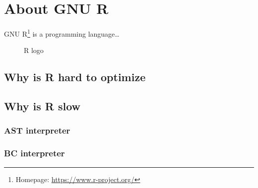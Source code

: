 \chapter{About GNU R}

GNU R\footnote{Homepage: \url{https://www.r-project.org/}} is a programming language\dots



\blind[1]

\begin{figure}[htbp]
\centering
{}
\caption{\label{fig:rlogo} R logo}
\end{figure}

\section{Why is R hard to optimize}
\todo
\blind[4]

\section{Why is R slow}
\todo
\blind[1]

\subsection{AST interpreter}
\todo
\blind[1]

\subsection{BC interpreter}
\todo
\blind[1]
